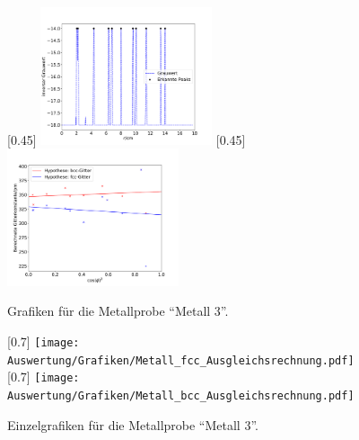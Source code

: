 \begin{figure}[h!]
  \centering
  [0.45\textwidth]{
  \centering
  \includegraphics[width=0.45\textwidth]{Auswertung/Grafiken/Metall_Peaks.pdf}
  }
  [0.45\textwidth]{
  \centering
  \includegraphics[width=0.45\textwidth]{Auswertung/Grafiken/Metall_Ausgleichsrechnung.pdf}
  }\\
  \label{Abb:Metall_Plots}
  \caption{Grafiken für die Metallprobe \enquote{Metall 3}.}
\end{figure}

\begin{figure}[p]
  \centering
  [0.7\textwidth]{
  \centering
  \texttt{[image: Auswertung/Grafiken/Metall\_fcc\_Ausgleichsrechnung.pdf]}
  }\\
  [0.7\textwidth]{
  \centering
  \texttt{[image: Auswertung/Grafiken/Metall\_bcc\_Ausgleichsrechnung.pdf]}
  }\\
  \label{Abb:Metall_Plots_a}
  \caption{Einzelgrafiken für die Metallprobe \enquote{Metall 3}.}
\end{figure}

